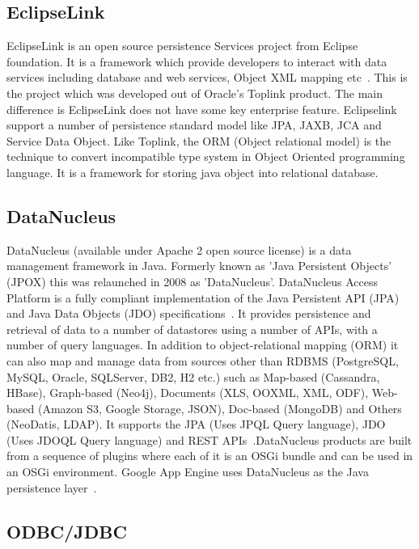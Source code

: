      \pv

\subsection{EclipseLink}

EclipseLink is an open source persistence Services project from
Eclipse foundation. It is a framework which provide developers to
interact with data services including database and web services,
Object XML mapping etc~\cite{www-eclipselink}. This is the project
which was developed out of Oracle's Toplink product. The main
difference is EclipseLink does not have some key enterprise
feature. Eclipselink support a number of persistence standard model
like JPA, JAXB, JCA and Service Data Object. Like Toplink, the ORM
(Object relational model) is the technique to convert incompatible
type system in Object Oriented programming language. It is a framework
for storing java object into relational database.

     \pv
     
\subsection{DataNucleus}

DataNucleus (available under Apache 2 open source license) is a data
management framework in Java. Formerly known as 'Java Persistent
Objects' (JPOX) this was relaunched in 2008 as
'DataNucleus'. DataNucleus Access Platform is a fully compliant
implementation of the Java Persistent API (JPA) and Java Data Objects
(JDO) specifications~\cite{www-DataNucleusWiki}. It provides
persistence and retrieval of data to a number of datastores using a
number of APIs, with a number of query languages. In addition to
object-relational mapping (ORM) it can also map and manage data from
sources other than RDBMS (PostgreSQL, MySQL, Oracle, SQLServer, DB2,
H2 etc.) such as Map-based (Cassandra, HBase), Graph-based (Neo4j),
Documents (XLS, OOXML, XML, ODF), Web-based (Amazon S3, Google
Storage, JSON), Doc-based (MongoDB) and Others (NeoDatis, LDAP). It
supports the JPA (Uses JPQL Query language), JDO (Uses JDOQL Query
language) and REST APIs~\cite{www-DataNucleus}.DataNucleus products
are built from a sequence of plugins where each of it is an OSGi
bundle and can be used in an OSGi environment. Google App Engine uses
DataNucleus as the Java persistence
layer~\cite{www-DataNucleusPerformance}.

     \pv
	   
\subsection{ODBC/JDBC}

